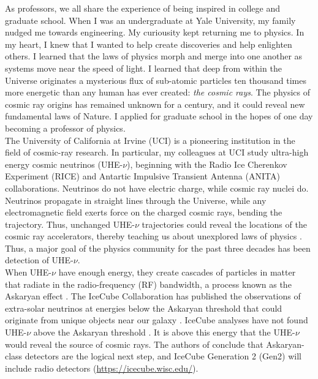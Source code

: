 \documentclass[../../main.tex]{subfiles}
\begin{document}
As professors, we all share the experience of being inspired in college and graduate school.  When I was an undergraduate at Yale University, my family nudged me towards engineering.  My curiousity kept returning me to physics.  In my heart, I knew that I wanted to help create discoveries and help enlighten others.  I learned that the laws of physics morph and merge into one another as systems move near the speed of light.  I learned that deep from within the Universe originates a mysterious flux of sub-atomic particles ten thousand times more energetic than any human has ever created: \textit{the cosmic rays}.  The physics of cosmic ray origins has remained unknown for a century, and it could reveal new fundamental laws of Nature.  I applied for graduate school in the hopes of one day becoming a professor of physics.
\\
\vspace{0.15cm}
The University of California at Irvine (UCI) is a pioneering institution in the field of cosmic-ray research.  In particular, my colleagues at UCI study ultra-high energy cosmic neutrinos (UHE-$\nu$), beginning with the Radio Ice Cherenkov Experiment (RICE) \cite{PhysRevD.85.062004} and Antartic Impulsive Transient Antenna (ANITA) \cite{PhysRevD.99.122001} collaborations. Neutrinos do not have electric charge, while cosmic ray nuclei do.  Neutrinos propagate in straight lines through the Universe, while any electromagnetic field exerts force on the charged cosmic rays, bending the trajectory.  Thus, unchanged UHE-$\nu$ trajectories could reveal the locations of the cosmic ray accelerators, thereby teaching us about unexplored laws of physics\cite{Astro2020_1} \cite{Astro2020_2} \cite{PhysRevD.83.113009}.  Thus, a major goal of the physics community for the past three decades has been detection of UHE-$\nu$.
\\
\vspace{0.15cm}
When UHE-$\nu$ have enough energy, they create cascades of particles in matter that radiate in the radio-frequency (RF) bandwidth, a process known as the Askaryan effect \cite{ask1} \cite{ask2} \cite{PhysRevLett.86.2802} \cite{PhysRevLett.99.171101} \cite{PhysRevD.101.083005}.  The IceCube Collaboration has published the observations of extra-solar neutrinos at energies below the Askaryan threshold that could originate from unique objects near our galaxy \cite{PhysRevLett.111.021103}.  IceCube analyses have not found UHE-$\nu$ above the Askaryan threshold \cite{PhysRevD.98.062003}.  It is above this energy that the UHE-$\nu$ would reveal the source of cosmic rays.  The authors of \cite{PhysRevD.98.062003} conclude that Askaryan-class detectors are the logical next step, and IceCube Generation 2 (Gen2) will include radio detectors (\url{https://icecube.wisc.edu/}).
\end{document}
